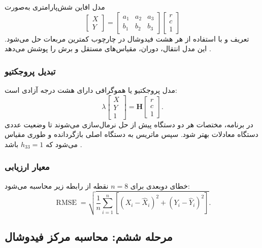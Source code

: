 \documentclass[12pt,a4paper]{article}
\begin{document}
مدل افاین شش‌پارامتری به‌صورت
\begin{equation}
\begin{bmatrix}X\\Y\end{bmatrix}
=
\begin{bmatrix}
a_1&a_2&a_3\\
b_1&b_2&b_3
\end{bmatrix}
\begin{bmatrix}r\\c\\1\end{bmatrix}
\end{equation}
تعریف و با استفاده از هر هشت فیدوشال در چارچوب کمترین مربعات حل می‌شود. این مدل
انتقال، دوران، مقیاس‌های مستقل و برش را پوشش می‌دهد
\cite{bjorck1996least,hartley2004multiple}.

\subsubsection{تبدیل پروجکتیو}

مدل پروجکتیو یا هموگرافی دارای هشت درجه آزادی است:
\begin{equation}
\lambda
\begin{bmatrix}X\\Y\\1\end{bmatrix}
=
\mathbf{H}
\begin{bmatrix}r\\c\\1\end{bmatrix}.
\end{equation}
در برنامه، مختصات هر دو دستگاه پیش از حل نرمال‌سازی می‌شوند تا وضعیت عددی دستگاه
معادلات بهتر شود. سپس ماتریس به دستگاه اصلی بازگردانده و طوری مقیاس می‌شود که
\(h_{33}=1\) باشد \cite{hartley1997eightpoint,hartley2004multiple}.

\subsubsection{معیار ارزیابی}

خطای دوبعدی   برای \(n=8\) نقطه از رابطه زیر محاسبه می‌شود:
\begin{equation}
\operatorname{RMSE}=
\sqrt{\frac{1}{n}\sum_{i=1}^{n}
\left[(X_i-\widehat X_i)^2+(Y_i-\widehat Y_i)^2\right]}.
\label{eq:rmse}
\end{equation}

\subsection{مرحله ششم: محاسبه مرکز فیدوشال}
\end{document}
